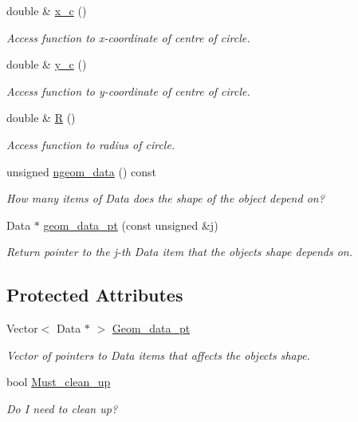 \begin{DoxyCompactItemize}
double \& \hyperlink{classoomph_1_1GeneralCircle_a9c84564d8239bd8b4a2b28649638dd4a}{x\+\_\+c} ()
\begin{DoxyCompactList}\small\item\em Access function to x-\/coordinate of centre of circle. \end{DoxyCompactList}\item 
double \& \hyperlink{classoomph_1_1GeneralCircle_afa91b6356920d73e05f81d6e7aaf0bf7}{y\+\_\+c} ()
\begin{DoxyCompactList}\small\item\em Access function to y-\/coordinate of centre of circle. \end{DoxyCompactList}\item 
double \& \hyperlink{classoomph_1_1GeneralCircle_adc9df8b14326bddb144231b0be5d06c0}{R} ()
\begin{DoxyCompactList}\small\item\em Access function to radius of circle. \end{DoxyCompactList}\item 
unsigned \hyperlink{classoomph_1_1GeneralCircle_a7cd69f069bb8042ba972b89940ec1808}{ngeom\+\_\+data} () const
\begin{DoxyCompactList}\small\item\em How many items of Data does the shape of the object depend on? \end{DoxyCompactList}\item 
Data $\ast$ \hyperlink{classoomph_1_1GeneralCircle_ad5c33bb9a727a8fe28be0087f5baa9f5}{geom\+\_\+data\+\_\+pt} (const unsigned \&j)
\begin{DoxyCompactList}\small\item\em Return pointer to the j-\/th Data item that the object\textquotesingle{}s shape depends on. \end{DoxyCompactList}\end{DoxyCompactItemize}
\subsection*{Protected Attributes}
\begin{DoxyCompactItemize}
\item 
Vector$<$ Data $\ast$ $>$ \hyperlink{classoomph_1_1GeneralCircle_a4a707f37b32d447dbe965177e442aa76}{Geom\+\_\+data\+\_\+pt}
\begin{DoxyCompactList}\small\item\em Vector of pointers to Data items that affects the object\textquotesingle{}s shape. \end{DoxyCompactList}\item 
bool \hyperlink{classoomph_1_1GeneralCircle_a6772cb425079b3afd2479663ddb0cb81}{Must\+\_\+clean\+\_\+up}
\begin{DoxyCompactList}\small\item\em Do I need to clean up? \end{DoxyCompactList}\end{DoxyCompactItemize}


